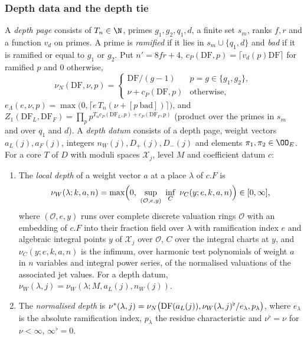 \subsubsection{Depth data and the depth tie}

\begin{definition}\label{pf:onto3:depdata}
A \emph{depth page} consists of $T_n\in\N$, primes $g_1,g_2,q_1,d$, a finite set $s_m$, ranks $f,r$ and a function
$v_d$ on primes. A prime is \emph{ramified} if it lies in $s_m\cup\{q_1,d\}$ and \emph{bad} if it is ramified or equal to
$g_1$ or $g_2$. Put $n'=8fr+4$, $c_P(\mathrm{DF},p)=\lceil v_d(p)\mathrm{DF}\rceil$ for ramified $p$ and $0$ otherwise,
\[
\nu_N(\mathrm{DF},\nu,p)=\begin{cases}\mathrm{DF}/(g-1)&p=g\in\{g_1,g_2\},\\ \nu+c_P(\mathrm{DF},p)&\text{otherwise},
\end{cases}
\]
$e_\Lambda(e,\nu,p)=\max\bigl(0,\lceil e\,T_n(\nu+[p\ \text{bad}])\rceil\bigr)$, and
$Z_1(\mathrm{DF}_L,\mathrm{DF}_F)=\prod_{p}p^{T_nc_P(\mathrm{DF}_L,p)+c_P(\mathrm{DF}_F,p)}$ (product over the primes in
$s_m$ and over $q_1$ and $d$). A \emph{depth datum} consists of a depth page, weight vectors $a_L(j),a_F(j)$, integers
$n_W(j),D_+(j),D_-(j)$ and elements $\pi_1,\pi_2\in\OO_E$. For a core $T$ of $D$ with moduli spaces $\mathcal X_j$,
level $M$ and coefficient datum $c$:
\begin{enumerate}[label=(\roman*)]
\item The \emph{local depth} of a weight vector $a$ at a place $\lambda$ of $c.F$ is
\[
\nu_W(\lambda;k,a,n)=\max\Bigl(0,\ \sup_{(\mathcal O,e,y)}\ \inf_{C}\ \nu_C(y;e,k,a,n)\Bigr)\in[0,\infty],
\]
where $(\mathcal O,e,y)$ runs over complete discrete valuation rings $\mathcal O$ with an embedding of $c.F$ into their
fraction field over $\lambda$ with ramification index $e$ and algebraic integral points $y$ of $\mathcal X_j$ over
$\mathcal O$, $C$ over the integral charts at $y$, and $\nu_C(y;e,k,a,n)$ is the infimum, over harmonic test
polynomials of weight $a$ in $n$ variables and integral power series, of the normalised valuations of the associated
jet values. For a depth datum, $\nu_W(\lambda,j)=\nu_W(\lambda;M,a_L(j),n_W(j))$.
\item The \emph{normalised depth} is $\nu^*(\lambda,j)=\nu_N\bigl(\operatorname{DF}(a_L(j)),\nu_W(\lambda,j)^\flat/e_\lambda,
p_\lambda\bigr)$, where $e_\lambda$ is the absolute ramification index, $p_\lambda$ the residue characteristic and
$\nu^\flat=\nu$ for $\nu<\infty$, $\infty^\flat=0$.

\end{enumerate}
\end{definition}
